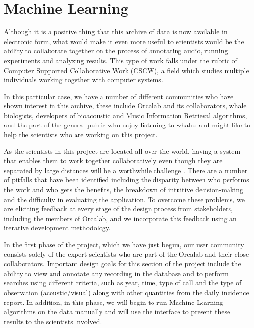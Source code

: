 
\section{Machine Learning}

Although it is a positive thing that this archive of data is now
available in electronic form, what would make it even more useful to
scientists would be the ability to collaborate together on the process
of annotating audio, running experiments and analyzing results.  This
type of work falls under the rubric of Computer Supported
Collaborative Work \cite{bannon91} (CSCW), a field which studies
multiple individuals working together with computer systems.

In this particular case, we have a number of different communities who
have shown interest in this archive, these include Orcalab and its
collaborators, whale biologists, developers of bioacoustic and Music
Information Retrieval algorithms, and the part of the general public
who enjoy listening to whales and might like to help the scientists
who are working on this project.  


As the scientists in this project are located all over the world,
having a system that enables them to work together collaboratively
even though they are separated by large distances will be a worthwhile
challenge \cite{bradner02} \cite{olson00}.  There are a number of
pitfalls that have been identified \cite{grudin88} including the
disparity between who performs the work and who gets the benefits, the
breakdown of intuitive decision-making and the difficulty in
evaluating the application.  To overcome these problems, we are
eliciting feedback at every stage of the design process from
stakeholders, including the members of Orcalab, and we incorporate
this feedback using an iterative development methodology.

In the first phase of the project, which we have just begun, our user
community consists solely of the expert scientists who are part of the
Orcalab and their close collaborators.  Important design goals for
this section of the project include the ability to view and annotate
any recording in the database and to perform searches using different
criteria, such as year, time, type of call and the type of observation
(acoustic/visual) along with other quantities from the daily incidence
report.  In addition, in this phase, we will begin to run Machine
Learning algorithms on the data manually and will use the interface to
present these results to the scientists involved.

